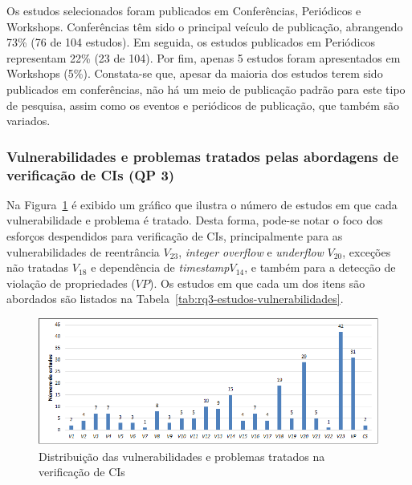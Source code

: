 

Os estudos selecionados foram publicados em Conferências, Periódicos e Workshops. Conferências têm sido o principal veículo de publicação, abrangendo 73\% (76 de 104 estudos). Em seguida, os estudos publicados em Periódicos representam 22\% (23 de 104). Por fim, apenas 5 estudos foram apresentados em Workshops (5\%). Constata-se que, apesar da maioria dos estudos terem sido publicados em conferências, não há um meio de publicação padrão para este tipo de pesquisa, assim como os eventos e periódicos de publicação, que também são variados.


\subsubsection*{\textbf{Vulnerabilidades e problemas tratados pelas abordagens de verificação de CIs (QP 3)}}


Na Figura~\ref{fig:rq3-vulnerabilidades} é exibido um gráfico que ilustra o número de estudos em que cada vulnerabilidade e problema é tratado. Desta forma, pode-se notar o foco dos esforços despendidos para verificação de CIs, principalmente para as vulnerabilidades de reentrância $V_{23}$, \textit{integer overflow} e \textit{underflow} $V_{20}$, exceções não tratadas $V_{18}$ e dependência de \textit{timestamp}$V_{14}$, e também para a detecção de violação de propriedades ($VP$). Os estudos em que cada um dos itens são abordados são listados na Tabela~\ref{tab:rq3-estudos-vulnerabilidades}.

\begin{figure}[!htb]
 \caption{Distribuição das vulnerabilidades e problemas tratados na verificação de CIs}
 \label{fig:rq3-vulnerabilidades}
 \centering
 \includegraphics[scale=0.7]{figuras/rq3-vulnerabilidades.png}
 \fdadospesquisa
\end{figure}

